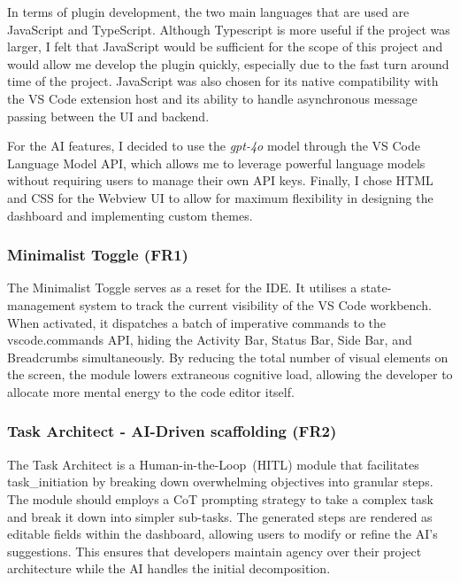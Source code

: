 In terms of plugin development, the two main languages that are used
 are JavaScript and TypeScript. Although Typescript is more useful if the project was larger, I felt that JavaScript would be sufficient for the scope of this project and would 
 allow me develop the plugin quickly, especially due to the fast turn around time of the project. JavaScript was also chosen for its native compatibility with the VS Code 
 extension host and its ability to handle asynchronous message passing between the UI and backend.~\cite{TypeScri5:online}
 
For the \gls{AI} features, I decided to use the \textit{gpt-4o} model through the VS Code Language Model \gls{API}, which allows me to leverage powerful language models without 
requiring users to manage their own \gls{API} keys. Finally, I chose HTML and CSS for the Webview UI to allow for maximum flexibility in designing the dashboard 
and implementing custom themes. 

\subsubsection{Minimalist Toggle (FR1)}

The Minimalist Toggle serves as a reset for the \gls{IDE}. It utilises a state-management system to track the current visibility of the VS Code workbench.
When activated, it dispatches a batch of imperative commands to the vscode.commands \gls{API}, hiding the Activity Bar, Status Bar, Side Bar, and Breadcrumbs simultaneously.
By reducing the total number of visual elements on the screen, the module lowers extraneous cognitive load, allowing the developer to allocate more mental energy to the
code editor itself.


\subsubsection{Task Architect - \gls{AI}-Driven \Gls{scaffolding} (FR2)}
The Task Architect is a Human-in-the-Loop~(\gls{HITL}) module that facilitates \gls{task_initiation} by breaking down overwhelming objectives into granular steps. The module should employs 
a \gls{CoT} prompting strategy to take a complex task and break it down into simpler sub-tasks.
The generated steps are rendered as editable fields within the dashboard, allowing users to modify or refine the \gls{AI}'s suggestions. This ensures that developers 
maintain agency over their project architecture while the \gls{AI} handles the initial decomposition.
\newline

